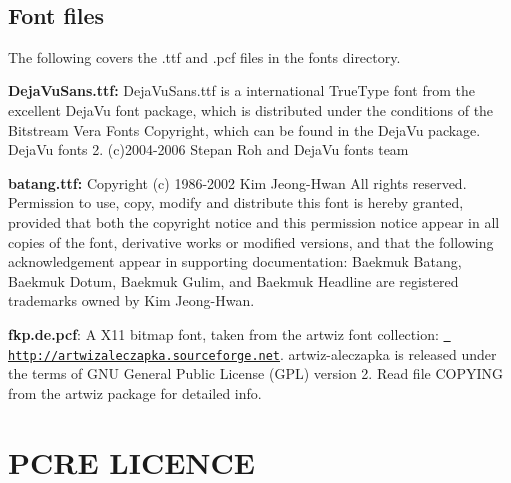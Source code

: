~\newline
 \hypertarget{datafile_licensing_data_lic_fonts}{}\subsection{Font files}\label{datafile_licensing_data_lic_fonts}
The following covers the .ttf and .pcf files in the fonts directory.
\begin{DoxyItemize}
\item {\bfseries{Deja\+Vu\+Sans.\+ttf\+:}} Deja\+Vu\+Sans.\+ttf is a international True\+Type font from the excellent Deja\+Vu font package, which is distributed under the conditions of the Bitstream Vera Fonts Copyright, which can be found in the Deja\+Vu package. Deja\+Vu fonts 2. (c)2004-\/2006 Stepan Roh and Deja\+Vu fonts team
\item {\bfseries{batang.\+ttf\+:}} Copyright (c) 1986-\/2002 Kim Jeong-\/\+Hwan All rights reserved. Permission to use, copy, modify and distribute this font is hereby granted, provided that both the copyright notice and this permission notice appear in all copies of the font, derivative works or modified versions, and that the following acknowledgement appear in supporting documentation\+: Baekmuk Batang, Baekmuk Dotum, Baekmuk Gulim, and Baekmuk Headline are registered trademarks owned by Kim Jeong-\/\+Hwan.
\item {\bfseries{fkp.\+de.\+pcf}}\+: A X11 bitmap font, taken from the artwiz font collection\+: \href{http://artwizaleczapka.sourceforge.net}{\texttt{ http\+://artwizaleczapka.\+sourceforge.\+net}}. artwiz-\/aleczapka is released under the terms of G\+NU General Public License (G\+PL) version 2. Read file \textquotesingle{}C\+O\+P\+Y\+I\+NG\textquotesingle{} from the artwiz package for detailed info. 
\end{DoxyItemize}\hypertarget{pcre_lic}{}\section{P\+C\+RE L\+I\+C\+E\+N\+CE}\label{pcre_lic}

\begin{DoxyVerbInclude}
\end{DoxyVerbInclude}
 